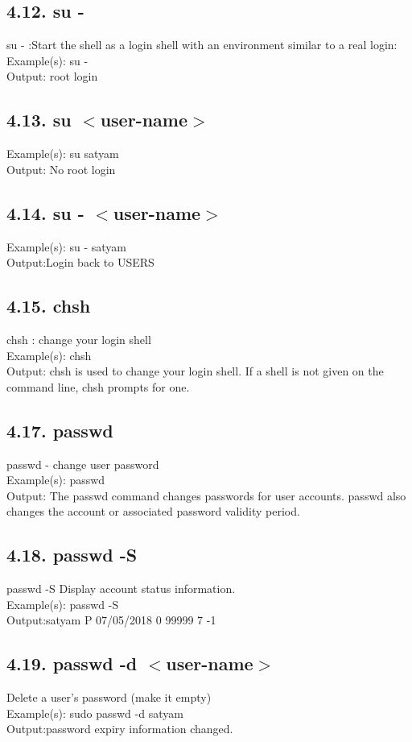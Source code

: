 \documentclass[11pt,a4]{article}
\begin{document}
\begin{enumerate}
\subsection*{4.12. su -}
su - :Start the shell as a login shell with an environment similar to a real login:
Example(s): su -\\
Output: root login
\subsection*{4.13. su $<$user-name$>$}
Example(s): su satyam\\
Output: No root login
\subsection*{4.14. su - $<$user-name$>$}
Example(s): su - satyam\\
Output:Login back to USERS

\subsection*{4.15. chsh}
chsh :  change your login shell\\
Example(s): chsh\\
Output: chsh is used to change your login shell.  If a shell is not given on the command line, chsh prompts for one.

\subsection*{4.17. passwd}
passwd - change user password\\
Example(s): passwd\\
Output: The passwd command changes passwords for user accounts. passwd also changes the
account or associated password validity period.

\subsection*{4.18. passwd -S}
passwd -S Display account status information.\\
Example(s): passwd -S\\
Output:satyam P 07/05/2018 0 99999 7 -1
\subsection*{4.19. passwd -d $<$user-name$>$}
Delete a user's password (make it empty)\\
Example(s): sudo passwd -d satyam\\
Output:password expiry information changed.

\end{enumerate}
\end{document}
